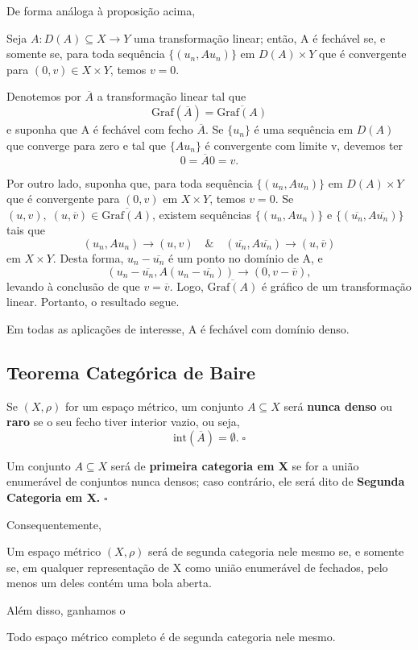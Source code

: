\documentclass[../functional_analysis.tex]{subfiles}
\begin{document}
De forma análoga à proposição acima,
\begin{prop*}
	Seja \(A:D(A)\subseteq X\rightarrow Y\) uma transformação linear; então, A é fechável se, e somente se, para toda sequência \(\{(u_{n}, Au_{n})\}\) em \(D(A)\times Y\) que é convergente para \((0, v)\in X\times Y\), temos \(v=0.\)
\end{prop*}
\begin{proof*}
	Denotemos por \(\overline{A}\) a transformação linear tal que
	\[
		\mathrm{Graf}(\overline{A}) = \overline{\mathrm{Graf}(A)}
	\]
	e suponha que A é fechável com fecho \(\overline{A}\). Se \(\{u_{n}\}\) é uma sequência em \(D(A)\) que converge para zero e tal que \(\{Au_{n}\}\) é convergente com limite v, devemos ter
	\[
		0=\overline{A}0 = v.
	\]

	Por outro lado, suponha que, para toda sequência \(\{(u_{n}, Au_{n})\}\) em \(D(A)\times Y\) que é convergente para \((0, v)\) em \(X\times Y\), temos \(v = 0\). Se \((u, v),\; (u, \overline{v})\in \overline{\mathrm{Graf}(A)}\), existem sequências \(\{(u_{n}, Au_{n})\}\) e \(\{(\overline{u_{n}}, A \overline{u_{n}})\}\) tais que
	\[
		(u_{n}, Au_{n})\rightarrow (u, v) \quad\&\quad (\overline{u_{n}}, A \overline{u_{n}})\rightarrow (u, \overline{v})
	\]
	em \(X\times Y.\) Desta forma, \(u_{n}-\overline{u_{n}}\) é um ponto no domínio de A, e
	\[
		(u_{n}-\overline{u_{n}}, A(u_{n}-\overline{u_{n}}))\rightarrow (0, v-\overline{v}),
	\]
	levando à conclusão de que \(v=\overline{v}.\) Logo, \(\overline{\mathrm{Graf}(A)}\) é gráfico de um transformação linear. Portanto, o resultado segue. \qedsymbol
\end{proof*}
Em todas as aplicações de interesse, A é fechável com domínio denso.
\subsection{Teorema Categórica de Baire}
\begin{def*}
	Se \((X, \rho )\) for um espaço métrico, um conjunto \(A\subseteq X\) será \textbf{nunca denso} ou \textbf{raro} se o seu fecho tiver interior vazio, ou seja,
	\[
		\mathrm{int}{(\overline{A})} = \emptyset .\; \square
	\]
\end{def*}
\begin{def*}
	Um conjunto \(A\subseteq X\) será de \textbf{primeira categoria em X} se for a união enumerável de conjuntos nunca densos; caso contrário, ele será dito de \textbf{Segunda Categoria em X.} \(\square\)
\end{def*}
Consequentemente,
\begin{prop*}
	Um espaço métrico \((X, \rho )\) será de segunda categoria nele mesmo se, e somente se, em qualquer representação de X como união enumerável de fechados, pelo menos um deles contém uma bola aberta.
\end{prop*}
Além disso, ganhamos o
\hypertarget{baire_theorem}{
	\begin{theorem*}
		Todo espaço métrico completo é de segunda categoria nele mesmo.
	\end{theorem*}
}
\end{document}
